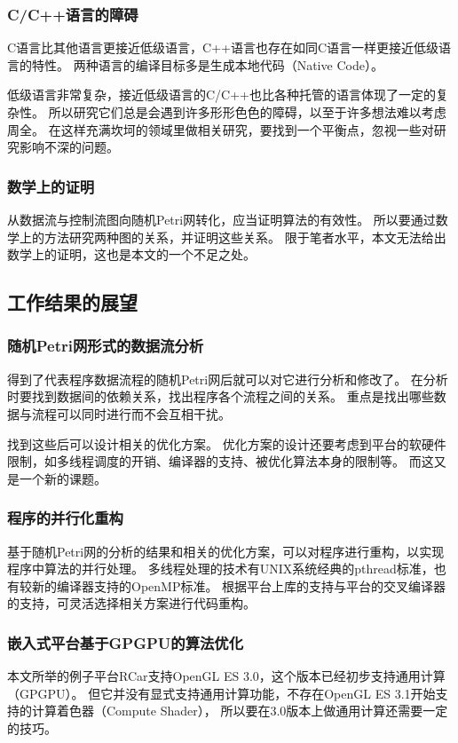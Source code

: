 \subsubsection{C/C++语言的障碍}
C语言比其他语言更接近低级语言，C++语言也存在如同C语言一样更接近低级语言的特性。
两种语言的编译目标多是生成本地代码（Native Code）。

低级语言非常复杂，接近低级语言的C/C++也比各种托管的语言体现了一定的复杂性。
所以研究它们总是会遇到许多形形色色的障碍，以至于许多想法难以考虑周全。
在这样充满坎坷的领域里做相关研究，要找到一个平衡点，忽视一些对研究影响不深的问题。

\subsubsection{数学上的证明}
从数据流与控制流图向随机Petri网转化，应当证明算法的有效性。
所以要通过数学上的方法研究两种图的关系，并证明这些关系。
限于笔者水平，本文无法给出数学上的证明，这也是本文的一个不足之处。




\subsection{工作结果的展望}

\subsubsection{随机Petri网形式的数据流分析}
得到了代表程序数据流程的随机Petri网后就可以对它进行分析和修改了。
在分析时要找到数据间的依赖关系，找出程序各个流程之间的关系。
重点是找出哪些数据与流程可以同时进行而不会互相干扰。

找到这些后可以设计相关的优化方案。
优化方案的设计还要考虑到平台的软硬件限制，如多线程调度的开销、编译器的支持、被优化算法本身的限制等。
而这又是一个新的课题。

\subsubsection{程序的并行化重构}
基于随机Petri网的分析的结果和相关的优化方案，可以对程序进行重构，以实现程序中算法的并行处理。
多线程处理的技术有UNIX系统经典的pthread标准，也有较新的编译器支持的OpenMP标准。
根据平台上库的支持与平台的交叉编译器的支持，可灵活选择相关方案进行代码重构。

\subsubsection{嵌入式平台基于GPGPU的算法优化}
本文所举的例子平台RCar支持OpenGL ES 3.0，这个版本已经初步支持通用计算（GPGPU）。
但它并没有显式支持通用计算功能，不存在OpenGL ES 3.1开始支持的计算着色器（Compute Shader），
所以要在3.0版本上做通用计算还需要一定的技巧。

